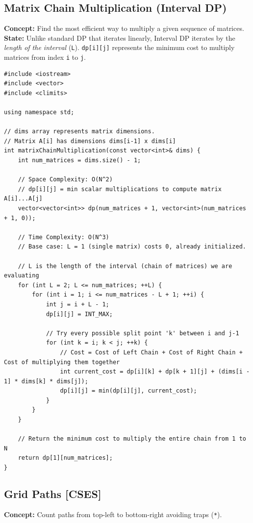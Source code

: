 \subsection{Matrix Chain Multiplication (Interval DP)}
\textbf{Concept:} Find the most efficient way to multiply a given sequence of matrices. 
\textbf{State:} Unlike standard DP that iterates linearly, Interval DP iterates by the \textit{length of the interval} (\texttt{L}). \texttt{dp[i][j]} represents the minimum cost to multiply matrices from index \texttt{i} to \texttt{j}.

\begin{lstlisting}
#include <iostream>
#include <vector>
#include <climits>

using namespace std;

// dims array represents matrix dimensions. 
// Matrix A[i] has dimensions dims[i-1] x dims[i]
int matrixChainMultiplication(const vector<int>& dims) {
    int num_matrices = dims.size() - 1; 
    
    // Space Complexity: O(N^2)
    // dp[i][j] = min scalar multiplications to compute matrix A[i]...A[j]
    vector<vector<int>> dp(num_matrices + 1, vector<int>(num_matrices + 1, 0));

    // Time Complexity: O(N^3)
    // Base case: L = 1 (single matrix) costs 0, already initialized.
    
    // L is the length of the interval (chain of matrices) we are evaluating
    for (int L = 2; L <= num_matrices; ++L) {
        for (int i = 1; i <= num_matrices - L + 1; ++i) {
            int j = i + L - 1;
            dp[i][j] = INT_MAX;

            // Try every possible split point 'k' between i and j-1
            for (int k = i; k < j; ++k) {
                // Cost = Cost of Left Chain + Cost of Right Chain + Cost of multiplying them together
                int current_cost = dp[i][k] + dp[k + 1][j] + (dims[i - 1] * dims[k] * dims[j]);
                dp[i][j] = min(dp[i][j], current_cost);
            }
        }
    }
    
    // Return the minimum cost to multiply the entire chain from 1 to N
    return dp[1][num_matrices];
}
\end{lstlisting}

\subsection{Grid Paths [CSES]}
\textbf{Concept:} Count paths from top-left to bottom-right avoiding traps (\texttt{*}).

